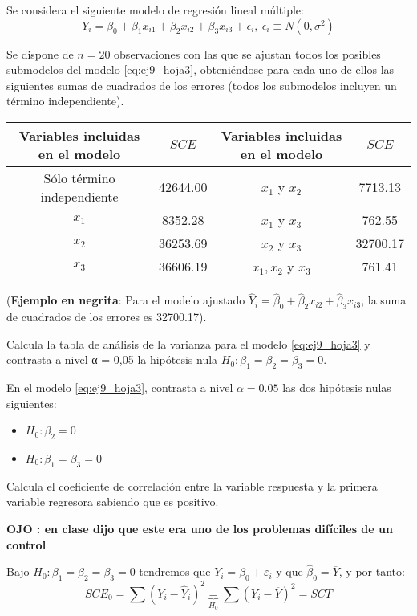 \begin{problem}[9]
Se considera el siguiente modelo de regresión lineal múltiple:
\begin{equation}
	\label{eq:ej9_hoja3}
	Y_i=β_0 + β_1x_{i1} + β_2x_{i2} + β_3x_{i3} + \epsilon_i,\ \epsilon_i \equiv N(0, σ^2)
\end{equation}

Se dispone de $n = 20$ observaciones con las que se ajustan todos los posibles submodelos del modelo \ref{eq:ej9_hoja3}, obteniéndose para cada uno de ellos las siguientes sumas de cuadrados de los errores (todos los submodelos incluyen un término independiente).

\scalebox{0.8} {
	\begin{tabular}{ c c | c c }
		Variables incluidas en el modelo & $SCE$ & Variables incluidas en el modelo & $SCE$ \\ \hline
		Sólo término independiente & 42644.00 & $x_1$ y $x_2$ & 7713.13 \\
		$x_1$ & 8352.28 & $x_1$ y $x_3$ & 762.55 \\
		$x_2$ & 36253.69 & $x_2$ y $x_3$ & 32700.17 \\
		$x_3$ & 36606.19 & $x_1, x_2$ y $x_3$ & 761.41
	\end{tabular}
}

(\textbf{Ejemplo en negrita}: Para el modelo ajustado $\hat{Y}_i = \hat{β}_0 + \hat{β}_2x_{i2} + \hat{β}_3x_{i3}$, la suma de cuadrados de los errores es 32700.17).

\ppart Calcula la tabla de análisis de la varianza para el modelo \ref{eq:ej9_hoja3} y contrasta a nivel α = 0,05 la hipótesis nula $H_0: β_1 =β_2 =β_3 =0$.

\ppart En el modelo \ref{eq:ej9_hoja3}, contrasta a nivel $α=0.05$ las dos hipótesis nulas siguientes:
\begin{itemize}
	\item $H_0: β_2 = 0$
	\item $H_0: β_1 = β_3 = 0$
\end{itemize}

\ppart Calcula el coeficiente de correlación entre la variable respuesta y la primera variable regresora sabiendo que es positivo.

\solution
\textbf{OJO : en clase dijo que este era uno de los problemas difíciles de un control}

\spart
Bajo $H_0: β_1 =β_2 =β_3 =0$ tendremos que $Y_i=β_0 + ε_i$ y que $\hat{β}_0 = \overline{Y}$, y por tanto:
\[SCE_0=\sum (Y_i - \hat{Y}_i)^2 \underbrace{=}_{H_0} \sum (Y_i - \overline{Y})^2 = SCT\]


\end{problem}
